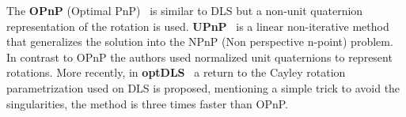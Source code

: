 \documentclass[letterpaper, 10 pt, conference]{ieeeconf}  %
\begin{document}
	The \textbf{OPnP} (Optimal PnP)~\cite{Zheng2013} is similar to DLS but a non-unit quaternion representation of the rotation is used.
	\textbf{UPnP}~\cite{Kneip2014} is a linear non-iterative method that generalizes the solution into the NPnP (Non perspective n-point) problem. %
	In contrast to OPnP the authors used normalized unit quaternions to represent rotations. %
	More recently, in \textbf{optDLS}~\cite{Nakano2015} a return to the Cayley rotation parametrization used on DLS is proposed, mentioning a simple trick to avoid the singularities, %
	the method is three times faster than OPnP. %
	
	
\end{document}
